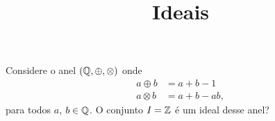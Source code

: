 \documentclass{beamer}
\title{Ideais}
\author[\autor]{\autor}
\institute[\instituto]{\instituto}
\date{}
\begin{document}
    \begin{frame}
        \maketitle
    \end{frame}


    \begin{frame}
        \begin{exercicio}
            Considere o anel $(\mathbb{Q}, \oplus, \otimes)$ onde
            \begin{align*}
                a \oplus b &= a + b - 1\\
                a \otimes b &= a + b - ab,
            \end{align*}
            para todos $a$, $b \in \mathbb{Q}$. O conjunto $I = \mathbb{Z}$ é um ideal desse anel?
        \end{exercicio}
    \end{frame}
\end{document}
